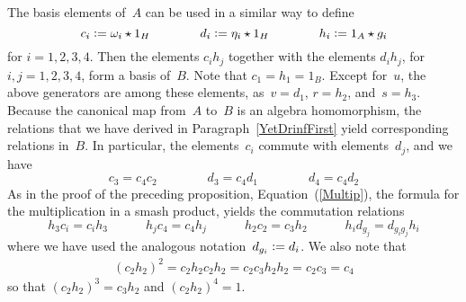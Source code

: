 \documentclass{article}
\numberwithin{equation}{section}
\theoremstyle{definition}
\theoremstyle{break}
\newcommand{\deq}{\vcentcolon =}
\newcommand{\1}{{(1)}}
\newcommand{\2}{{(2)}}
\newcommand{\3}{{(3)}}
\newcommand{\B}{1_B}
\newcommand{\HH}{1_H}
\begin{document}
The basis elements of~$A$ can be used in a similar way to define
\[c_i \deq \omega_i \star \HH \qquad  \qquad  d_i \deq \eta _i \star \HH \qquad \qquad
h_i \deq 1_A \star g_i\]
for $i=1,2,3,4$. Then the elements $c_i h_j$ together with the elements $d_i h_j$,
for~$i, j = 1,2,3, 4$, form a basis of~$B$. Note that $c_1 = h_1 = \B$. Except for~$u$, the above generators are among these elements, as~$v=d_1$, $r=h_2$, and~$s=h_3$. Because the canonical map from~$A$ to~$B$ is an algebra homomorphism, the relations that we have derived in Paragraph~\ref{YetDrinfFirst} yield corresponding relations in~$B$. In particular, the elements~$c_i$ commute with elements~$d_j$, and we have
\[c_3 = c_4 c_2 \qquad \qquad d_3 = c_4 d_1 \qquad \qquad d_4 = c_4 d_2  \]
As in the proof of the preceding proposition, Equation~(\ref{Multip}), the formula for the multiplication in a smash product, yields the commutation relations
\[h_3 c_i = c_i h_3 \qquad \quad  h_j c_4  = c_4 h_j \qquad \quad
h_2 c_2 = c_3 h_2 \qquad \quad  h_id_{g_j} = d_{g_i g_j}h_i\]
where we have used the analogous notation~$d_{g_i} \deq d_i$. We also note that
\begin{align} \label{c2h2}
(c_2 h_2)^2 = c_2 h_2 c_2 h_2 = c_2 c_3 h_2 h_2 = c_2 c_3 = c_4
\end{align}
so that $(c_2 h_2)^3 = c_3 h_2$ and $(c_2 h_2)^4 = 1$.
\end{document}
